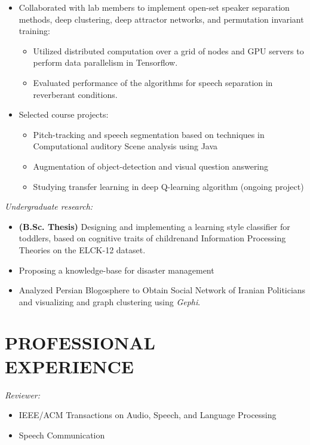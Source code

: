 \documentclass[margin, 10pt]{res}
\begin{document}
\begin{resume}
\begin{itemize}
\item Collaborated with lab members to implement open-set speaker separation methods, deep clustering, deep attractor networks, and permutation invariant training:
	\begin{itemize}
	\item Utilized distributed computation over a grid of nodes and GPU servers to perform data parallelism in Tensorflow.
	\item Evaluated performance of the algorithms for speech separation in reverberant conditions.
	\end{itemize}

\item Selected course projects:
	\begin{itemize}
		\item Pitch-tracking and speech segmentation based on techniques in Computational auditory Scene analysis using Java
		\item Augmentation of object-detection and visual question answering 
		\item Studying transfer learning in deep Q-learning algorithm (ongoing project)
	\end{itemize}

\end{itemize}

\textit{Undergraduate research:}
\begin{itemize}
\item \textbf{(B.Sc. Thesis)} Designing and implementing a learning style classifier for toddlers, based on cognitive traits of childrenand Information Processing Theories on the ELCK-12 dataset.
\item Proposing a knowledge-base for disaster management
\item Analyzed Persian Blogosphere to Obtain Social Network of Iranian Politicians and visualizing and graph clustering using \textit{Gephi}.
\end{itemize}

\section{PROFESSIONAL \\ EXPERIENCE}
\textit{Reviewer:}
\begin{itemize}
\item IEEE/ACM Transactions on Audio, Speech, and Language Processing
\item Speech Communication
\end{itemize}


\end{resume}
\end{document}
